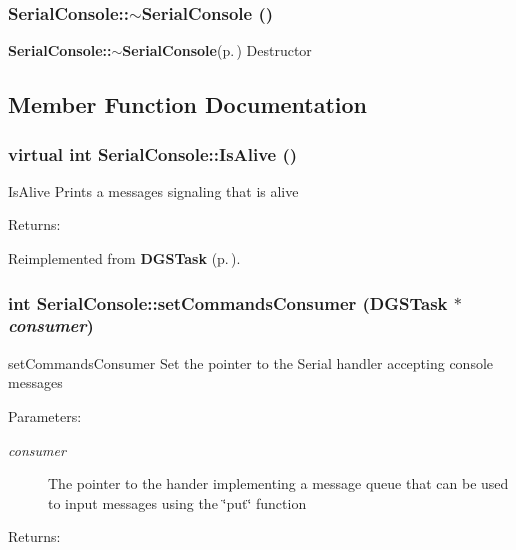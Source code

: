 \subsubsection{\setlength{\rightskip}{0pt plus 5cm}Serial\-Console::$\sim${\bf Serial\-Console} ()}\label{classSerialConsole_a1}


{\bf Serial\-Console::$\sim$Serial\-Console}{\rm (p.\,\pageref{classSerialConsole_a1})} Destructor 

\subsection{Member Function Documentation}
\subsubsection{\setlength{\rightskip}{0pt plus 5cm}virtual int Serial\-Console::Is\-Alive ()\hspace{0.3cm}{\tt  [inline, virtual]}}\label{classSerialConsole_a4}


Is\-Alive Prints a messages signaling that is alive

\begin{Desc}
\item[Returns:]\end{Desc}


Reimplemented from {\bf DGSTask} {\rm (p.\,\pageref{classDGSTask_a1})}.
\subsubsection{\setlength{\rightskip}{0pt plus 5cm}int Serial\-Console::set\-Commands\-Consumer ({\bf DGSTask} $\ast$ {\em consumer})\hspace{0.3cm}{\tt  [inline]}}\label{classSerialConsole_a3}


set\-Commands\-Consumer Set the pointer to the Serial handler accepting console messages

\begin{Desc}
\item[Parameters:]
\begin{description}
\item[{\em consumer}]The pointer to the hander implementing a message queue that can be used to input messages using the \char`\"{}put\char`\"{} function\end{description}
\end{Desc}
\begin{Desc}
\item[Returns:]\end{Desc}
